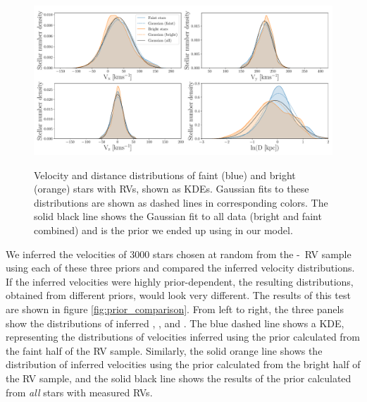 \begin{figure}[ht!]
\caption{
    Velocity and distance distributions of faint (blue) and bright (orange)
    stars with RVs, shown as KDEs.
    Gaussian fits to these distributions are shown as dashed lines in
    corresponding colors.
    The solid black line shows the Gaussian fit to all data (bright and faint
    combined) and is the prior we ended up using in our model.
}
  \centering
    \includegraphics[width=1\textwidth]{prior_distributions}
\label{fig:prior_distributions}
\end{figure}
We inferred the velocities of 3000 stars chosen at random from the
\gaia-\lamost\ RV sample using each of these three priors and compared the
inferred velocity distributions.
If the inferred velocities were highly prior-dependent, the resulting
distributions, obtained from different priors, would look very different.
The results of this test are shown in figure \ref{fig:prior_comparison}.
From left to right, the three panels show the distributions of inferred \vx,
\vy, and \vz.
The blue dashed line shows a KDE, representing the
distributions of velocities inferred using the prior calculated from the faint
half of the RV sample.
Similarly, the solid orange line shows the distribution of inferred velocities
using the prior calculated from the bright half of the RV sample, and the
solid black line shows the results of the prior calculated from {\it all}
stars with measured RVs.

